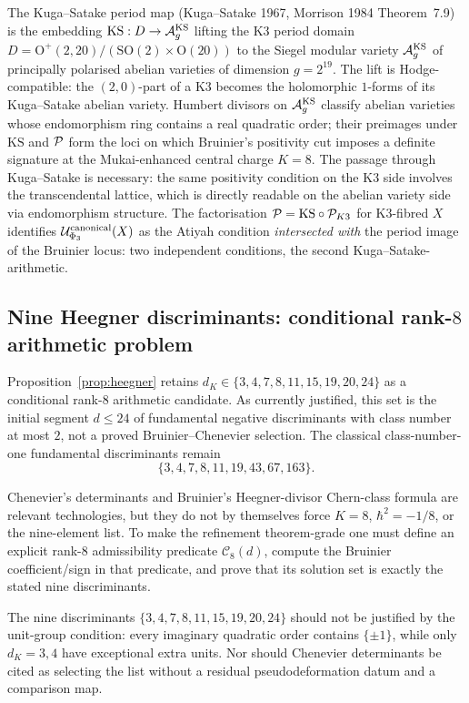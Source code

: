 The Kuga--Satake period map (Kuga--Satake 1967, Morrison 1984 Theorem~7.9) is the embedding $\mathrm{KS} : D \to \mathcal{A}_g^{\mathrm{KS}}$ lifting the K3 period domain $D = \mathrm{O}^+(2, 20)/(\mathrm{SO}(2) \times \mathrm{O}(20))$ to the Siegel modular variety $\mathcal{A}_g^{\mathrm{KS}}$ of principally polarised abelian varieties of dimension $g = 2^{19}$. The lift is Hodge-compatible: the $(2,0)$-part of a K3 becomes the holomorphic $1$-forms of its Kuga--Satake abelian variety. Humbert divisors on $\mathcal{A}_g^{\mathrm{KS}}$ classify abelian varieties whose endomorphism ring contains a real quadratic order; their preimages under $\mathrm{KS}$ and $\mathcal{P}$ form the loci on which Bruinier's positivity cut imposes a definite signature at the Mukai-enhanced central charge $K = 8$. The passage through Kuga--Satake is necessary: the same positivity condition on the K3 side involves the transcendental lattice, which is directly readable on the abelian variety side via endomorphism structure. The factorisation $\mathcal{P} = \mathrm{KS} \circ \mathcal{P}_{K3}$ for K3-fibred $X$ identifies $\mathcal{U}^{\mathrm{canonical}}_{\Phi_3}(X)$ as the Atiyah condition \emph{intersected with} the period image of the Bruinier locus: two independent conditions, the second Kuga--Satake-arithmetic.

\subsection{Nine Heegner discriminants: conditional rank-$8$ arithmetic problem}
\label{subsec:heegner-chenevier}

Proposition~\ref{prop:heegner} retains
$d_K \in \{3, 4, 7, 8, 11, 15, 19, 20, 24\}$ as a conditional
rank-$8$ arithmetic candidate. As currently justified, this set is the
initial segment $d\leq24$ of fundamental negative discriminants with
class number at most $2$, not a proved Bruinier--Chenevier selection.
The classical class-number-one fundamental discriminants remain
\[
  \{3,4,7,8,11,19,43,67,163\}.
\]

Chenevier's determinants and Bruinier's Heegner-divisor Chern-class
formula are relevant technologies, but they do not by themselves force
$K=8$, $\hbar^2=-1/8$, or the nine-element list. To make the refinement
theorem-grade one must define an explicit rank-$8$ admissibility
predicate $\mathcal C_8(d)$, compute the Bruinier coefficient/sign in
that predicate, and prove that its solution set is exactly the stated
nine discriminants.

The nine discriminants $\{3, 4, 7, 8, 11, 15, 19, 20, 24\}$ should not
be justified by the unit-group condition: every imaginary quadratic
order contains $\{\pm1\}$, while only $d_K=3,4$ have exceptional extra
units. Nor should Chenevier determinants be cited as selecting the list
without a residual pseudodeformation datum and a comparison map.

